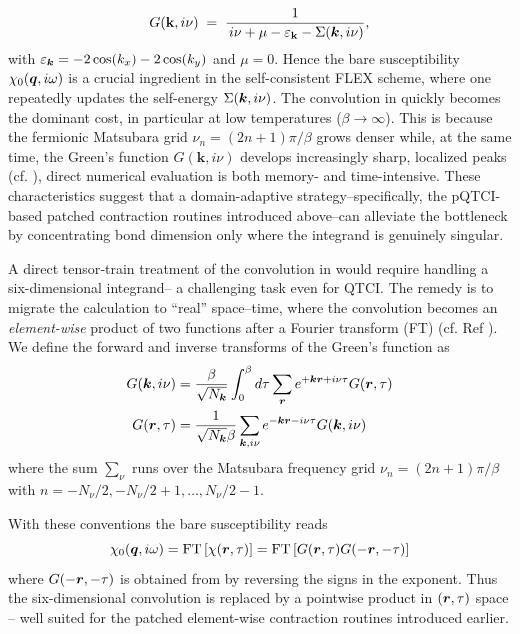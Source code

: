 \begin{equation}
  G(\mathbf{k}, i\nu)
  \;=\;
  \frac{1}
       {\,i\nu+\mu-\varepsilon_{\mathbf{k}}-\Sigma(\boldsymbol{k}, i\nu)},
       \label{eq:greenBubble}
\end{equation}
with $\varepsilon_{\boldsymbol{k}} = -2 \cos (k_x) - 2 \cos (k_y)$ and $\mu=0$. Hence the bare susceptibility $\chi_{0}(\boldsymbol{q}, i\omega)$ is a crucial ingredient in the self-consistent FLEX scheme, where one repeatedly updates the self-energy $\Sigma(\boldsymbol{k}, i\nu)$. The convolution in  quickly becomes the dominant cost, in particular at low temperatures ($\beta \to \infty$). This is because the fermionic Matsubara grid \(\nu_n=(2n+1)\pi/\beta\) grows denser while, at the same time, the Green’s function $G(\mathbf{k}, i\nu)$ develops increasingly sharp, localized peaks (cf. ), direct numerical evaluation is both memory- and time-intensive. These characteristics suggest that a domain-adaptive strategy--specifically, the pQTCI-based patched contraction routines introduced above--can alleviate the bottleneck by concentrating bond dimension only where the integrand is genuinely singular.

A direct tensor‐train treatment of the convolution in  would require handling a six-dimensional integrand-- a challenging task even for QTCI. The remedy is to migrate the calculation to “real” space–time, where the
convolution becomes an \emph{element-wise} product of two functions after a Fourier transform (FT) (cf. Ref \cite{Rakhuba2015}).
We define the forward and inverse transforms of the Green’s function as
\begin{align}
     G(\boldsymbol{k}, i\nu) &=  \frac{\beta}{\sqrt{N_{\boldsymbol{k}}}}\int_{0}^{\beta} d\tau \sum_{\boldsymbol{r}} e^{+\boldsymbol{k}\boldsymbol{r}+i\nu\tau}  G(\boldsymbol{r}, \tau) 
     \label{eq:FTGreensFunc} 
     \\
    G(\boldsymbol{r}, \tau) &= \frac{1}{\sqrt{N_{\boldsymbol{k}}}\beta}\sum_{\boldsymbol{k},i\nu} e^{-\boldsymbol{k}\boldsymbol{r}-i\nu\tau} G(\boldsymbol{k}, i\nu) 
    \label{eq:invFTGreensFunc} 
\end{align}
where the sum $\sum_{\nu}$ runs over the Matsubara frequency grid \(\nu_n=(2n+1)\pi/\beta\) with $n=-N_{\nu}/2, -N_{\nu}/2+1, \dots, N_{\nu}/2-1$. 

With these conventions the bare susceptibility reads
\begin{equation}
    \chi_{0}(\boldsymbol{q}, i\omega) = \text{FT}\left[ \chi(\boldsymbol{r}, \tau) \right] = \text{FT}\left[ G(\boldsymbol{r}, \tau)G(-\boldsymbol{r}, -\tau)\right]
\end{equation}
where  $G(-\boldsymbol{r}, -\tau)$  is obtained from  by reversing the signs in the exponent. Thus the six-dimensional convolution is replaced by a pointwise product in $(\boldsymbol{r}, \tau)$ space -- well suited for the patched element-wise contraction routines introduced earlier.

